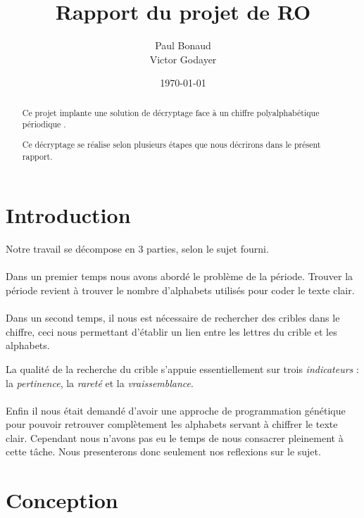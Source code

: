\documentclass[a4paper, 11pt]{article}
\begin{document}
\title{Rapport du projet de RO}
\author{Paul Bonaud\\
  Victor Godayer}
\date\today

\maketitle

\begin{abstract}
  Ce projet implante une solution de décryptage face à un chiffre
  polyalphabétique périodique .

  Ce décryptage se réalise selon plusieurs étapes que nous décrirons
  dans le présent rapport.
\end{abstract}
\newpage
\tableofcontents
\newpage


\section{Introduction}
Notre travail se décompose en 3 parties, selon le sujet fourni.

\paragraph{}
Dans un premier temps nous avons abordé le problème de la période.
Trouver la période revient à trouver le nombre d'alphabets utilisés pour
coder le texte clair.

\paragraph{}
Dans un second temps, il nous est nécessaire de rechercher des cribles
dans le chiffre, ceci nous permettant d'établir un lien entre les
lettres du crible et les alphabets.

La qualité de la recherche du crible s'appuie essentiellement sur
trois \textit{indicateurs} : la \textit{pertinence}, la
\textit{rareté} et la \textit{vraissemblance}.

\paragraph{}
Enfin il nous était demandé d'avoir une approche de programmation génétique pour
pouvoir retrouver complètement les alphabets servant à chiffrer le
texte clair. Cependant nous n'avons pas eu le temps de nous consacrer
pleinement à cette tâche. Nous presenterons donc seulement nos
reflexions sur le sujet.


\section{Conception}
\end{document}
